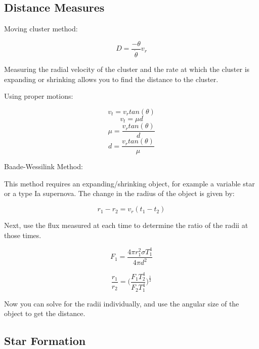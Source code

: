 \subsection{Distance Measures}

Moving cluster method:

\begin{equation}
D = \frac{-\theta}{\dot \theta}v_r
\end{equation}

Measuring the radial velocity of the cluster and the rate at which the cluster is expanding or shrinking allows you to find the distance to the cluster.

Using proper motions:

\begin{equation}
v_t = v_rtan(\theta)
\end{equation}
\begin{equation}
v_t = \mu d
\end{equation}
\begin{equation}
\mu = \frac{v_rtan(\theta)}{d}
\end{equation}
\begin{equation}
d = \frac{v_rtan(\theta)}{\mu}
\end{equation}

Baade-Wessilink Method:

This method requires an expanding/shrinking object, for example a variable star or a type Ia supernova.  The change in the radius of the object is given by:

\begin{equation}
r_1 - r_2 = v_r(t_1 - t_2)
\end{equation}

Next, use the flux measured at each time to determine the ratio of the radii at those times.

\begin{equation}
F_1 = \frac{4\pi r_1^2\sigma T_1^4}{4\pi d^2}
\end{equation}

\begin{equation}
\frac{r_1}{r_2} = \bigg(\frac{F_1T_2^4}{F_2T_1^4}\bigg)^{\frac{1}{2}}
\end{equation}

Now you can solve for the radii individually, and use the angular size of the object to get the distance.  


\subsection{Star Formation}

